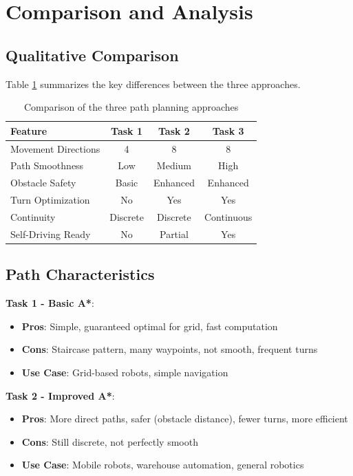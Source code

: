 \documentclass[aps,letterpaper,10pt]{revtex4}
\begin{document}
\newpage
\section{Comparison and Analysis}

\subsection{Qualitative Comparison}

Table \ref{tab:comparison} summarizes the key differences between the three approaches.

\begin{table}[H]
\begin{center}
\begin{tabular}{|l|c|c|c|}
\hline
\textbf{Feature} & \textbf{Task 1} & \textbf{Task 2} & \textbf{Task 3} \\ \hline
Movement Directions & 4 & 8 & 8 \\ \hline
Path Smoothness & Low & Medium & High \\ \hline
Obstacle Safety & Basic & Enhanced & Enhanced \\ \hline
Turn Optimization & No & Yes & Yes \\ \hline
Continuity & Discrete & Discrete & Continuous \\ \hline
Self-Driving Ready & No & Partial & Yes \\ \hline
\end{tabular}
\end{center}
\caption{Comparison of the three path planning approaches}
\label{tab:comparison}
\end{table}

\subsection{Path Characteristics}

\textbf{Task 1 - Basic A*}:
\begin{itemize}
    \item \textbf{Pros}: Simple, guaranteed optimal for grid, fast computation
    \item \textbf{Cons}: Staircase pattern, many waypoints, not smooth, frequent turns
    \item \textbf{Use Case}: Grid-based robots, simple navigation
\end{itemize}

\textbf{Task 2 - Improved A*}:
\begin{itemize}
    \item \textbf{Pros}: More direct paths, safer (obstacle distance), fewer turns, more efficient
    \item \textbf{Cons}: Still discrete, not perfectly smooth
    \item \textbf{Use Case}: Mobile robots, warehouse automation, general robotics
\end{itemize}
\end{document}
